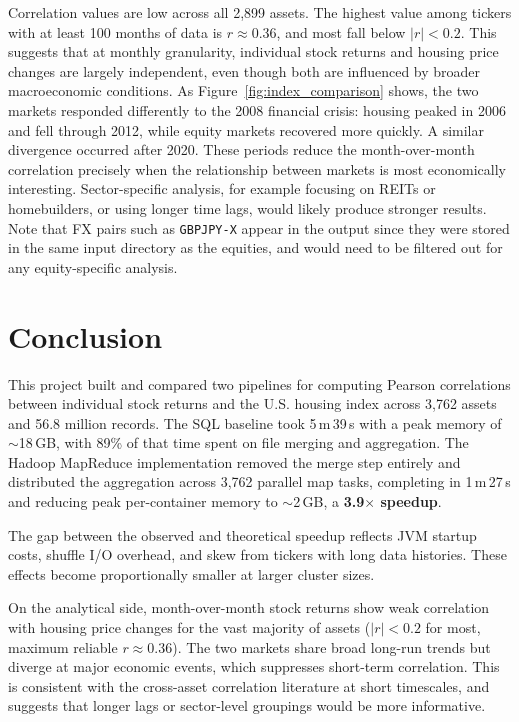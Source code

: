 \documentclass[11pt]{article}
\begin{document}
Correlation values are low across all 2,899 assets. The highest value among tickers with at least 100 months of data is $r \approx 0.36$, and most fall below $|r| < 0.2$. This suggests that at monthly granularity, individual stock returns and housing price changes are largely independent, even though both are influenced by broader macroeconomic conditions. As Figure~\ref{fig:index_comparison} shows, the two markets responded differently to the 2008 financial crisis: housing peaked in 2006 and fell through 2012, while equity markets recovered more quickly. A similar divergence occurred after 2020. These periods reduce the month-over-month correlation precisely when the relationship between markets is most economically interesting. Sector-specific analysis, for example focusing on REITs or homebuilders, or using longer time lags, would likely produce stronger results. Note that FX pairs such as \texttt{GBPJPY-X} appear in the output since they were stored in the same input directory as the equities, and would need to be filtered out for any equity-specific analysis.

\section{Conclusion}

This project built and compared two pipelines for computing Pearson correlations between individual stock returns and the U.S. housing index across 3,762 assets and 56.8 million records. The SQL baseline took 5\,m\,39\,s with a peak memory of $\sim$18\,GB, with 89\% of that time spent on file merging and aggregation. The Hadoop MapReduce implementation removed the merge step entirely and distributed the aggregation across 3,762 parallel map tasks, completing in 1\,m\,27\,s and reducing peak per-container memory to $\sim$2\,GB, a \textbf{3.9$\times$ speedup}.

The gap between the observed and theoretical speedup reflects JVM startup costs, shuffle I/O overhead, and skew from tickers with long data histories. These effects become proportionally smaller at larger cluster sizes.

On the analytical side, month-over-month stock returns show weak correlation with housing price changes for the vast majority of assets ($|r| < 0.2$ for most, maximum reliable $r \approx 0.36$). The two markets share broad long-run trends but diverge at major economic events, which suppresses short-term correlation. This is consistent with the cross-asset correlation literature at short timescales, and suggests that longer lags or sector-level groupings would be more informative.
\end{document}
